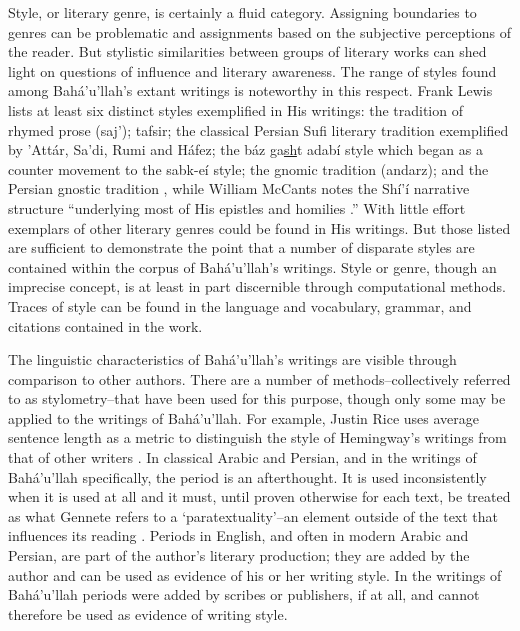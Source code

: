 \documentclass[12pt, oneside]{report}
\begin{document}
\par
Style, or literary genre, is certainly a fluid category.
Assigning boundaries to genres can be problematic and assignments based on the subjective perceptions of the reader.
But stylistic similarities between groups of literary works can shed light on questions of influence and literary awareness.
The range of styles found among Bah\'{a}'u'llah's extant writings is noteworthy in this respect.
Frank Lewis lists at least six distinct styles exemplified in His writings: the tradition of rhymed prose (saj'); tafsir; the classical Persian Sufi literary tradition exemplified by 'Att\'{a}r, Sa'di, Rumi and H\'{a}fez; the b\'{a}z ga\underline{sh}t adab\'{i} style which began as a counter movement to the sabk-e\'{i} style; the gnomic tradition (andarz); and the Persian gnostic tradition \cite{lewis_frank_scripture_1997}, while William McCants notes the Sh\'{i}'\'{i} narrative structure ``underlying most of His epistles and homilies \cite{mccants_wronged_2002}.''
With little effort exemplars of other literary genres could be found in His writings.
But those listed are sufficient to demonstrate the point that a number of disparate styles are contained within the corpus of Bah\'{a}'u'llah's writings.
Style or genre, though an imprecise concept, is at least in part discernible through computational methods.
Traces of style can be found in the language and vocabulary, grammar, and citations contained in the work.
\par
The linguistic characteristics of Bah\'{a}'u'llah's writings are visible through comparison to other authors.
There are a number of methods–collectively referred to as stylometry–that have been used for this purpose, though only some may be applied to the writings of Bah\'{a}'u'llah.
For example, Justin Rice uses average sentence length as a metric to distinguish the style of Hemingway's writings from that of other writers \cite{justin_rice_what_2018}.
In classical Arabic and Persian, and in the writings of Bah\'{a}'u'llah specifically, the period is an afterthought.
It is used inconsistently when it is used at all and it must, until proven otherwise for each text, be treated as what Gennete refers to a `paratextuality'–an element outside of the text that influences its reading \cite{genette_gerard_palimpsests:_1997}.
Periods in English, and often in modern Arabic and Persian, are part of the author's literary production; they are added by the author and can be used as evidence of his or her writing style.
In the writings of Bah\'{a}'u'llah periods were added by scribes or publishers, if at all, and cannot therefore be used as evidence of writing style.
\end{document}
